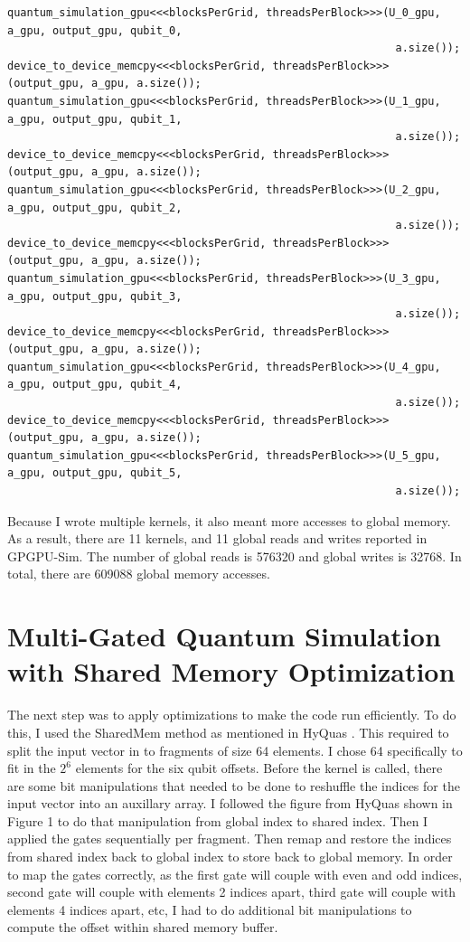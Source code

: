 \documentclass{article}
\begin{document}
\begin{verbatim}
quantum_simulation_gpu<<<blocksPerGrid, threadsPerBlock>>>(U_0_gpu, a_gpu, output_gpu, qubit_0,
                                                            a.size());
device_to_device_memcpy<<<blocksPerGrid, threadsPerBlock>>>(output_gpu, a_gpu, a.size());
quantum_simulation_gpu<<<blocksPerGrid, threadsPerBlock>>>(U_1_gpu, a_gpu, output_gpu, qubit_1,
                                                            a.size());
device_to_device_memcpy<<<blocksPerGrid, threadsPerBlock>>>(output_gpu, a_gpu, a.size());
quantum_simulation_gpu<<<blocksPerGrid, threadsPerBlock>>>(U_2_gpu, a_gpu, output_gpu, qubit_2,
                                                            a.size());
device_to_device_memcpy<<<blocksPerGrid, threadsPerBlock>>>(output_gpu, a_gpu, a.size());
quantum_simulation_gpu<<<blocksPerGrid, threadsPerBlock>>>(U_3_gpu, a_gpu, output_gpu, qubit_3,
                                                            a.size());
device_to_device_memcpy<<<blocksPerGrid, threadsPerBlock>>>(output_gpu, a_gpu, a.size());
quantum_simulation_gpu<<<blocksPerGrid, threadsPerBlock>>>(U_4_gpu, a_gpu, output_gpu, qubit_4,
                                                            a.size());
device_to_device_memcpy<<<blocksPerGrid, threadsPerBlock>>>(output_gpu, a_gpu, a.size());
quantum_simulation_gpu<<<blocksPerGrid, threadsPerBlock>>>(U_5_gpu, a_gpu, output_gpu, qubit_5,
                                                            a.size());
\end{verbatim}

Because I wrote multiple kernels, it also meant more accesses to global memory. As a result, there are 11 kernels, and 11 global reads and writes reported in GPGPU-Sim. The number of global reads is 576320 and global writes is 32768. In total, there are 609088 global memory accesses.

\section{Multi-Gated Quantum Simulation with Shared Memory Optimization}
The next step was to apply optimizations to make the code run efficiently. To do this, I used the SharedMem method as mentioned in HyQuas \cite{hyquas}. This required to split the input vector in to fragments of size 64 elements. I chose 64 specifically to fit in the $2^6$ elements for the six qubit offsets. Before the kernel is called, there are some bit manipulations that needed to be done to reshuffle the indices for the input vector into an auxillary array. I followed the figure from HyQuas shown in Figure 1 to do that manipulation from global index to shared index. Then I applied the gates sequentially per fragment. Then remap and restore the indices from shared index back to global index to store back to global memory. In order to map the gates correctly, as the first gate will couple with even and odd indices, second gate will couple with elements 2 indices apart, third gate will couple with elements 4 indices apart, etc, I had to do additional bit manipulations to compute the offset within shared memory buffer.
\end{document}
